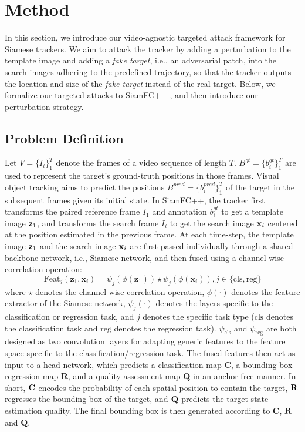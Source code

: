 \documentclass[journal]{IEEEtran}
\newcommand{\ie}{i.e.}
\renewcommand{\uline}{}
\begin{document}
\section{Method}\label{method}

In this section, we introduce our video-agnostic targeted attack framework for Siamese trackers. We aim to attack the tracker by adding a perturbation to the template image and adding a \textit{fake target}, i.e., an adversarial patch, into the search images adhering to the predefined trajectory, so that the tracker outputs the location and size of the \textit{fake target} instead of the real target. Below, we formalize our targeted attacks to SiamFC++ \cite{SiamFC++}, and then introduce our perturbation strategy.
\vspace{-5mm}
 
\subsection{Problem Definition}\label{problemdefinition}

Let $V=\{I_i\}_1^T$ denote the frames of a video sequence of length $T$. $B^{gt}=\{b^{gt}_i\}_1^T$ are used to represent the target's ground-truth positions in those frames. Visual object tracking aims to predict the positions $B^{pred}=\{b^{pred}_i\}_1^T$ of the target in the subsequent frames given its initial state. In SiamFC++, the tracker first transforms the paired reference frame $I_1$ and annotation $b_1^{gt}$ to get a template image $\textbf z_1$, and transforms the search frame $I_i$ to get the search image $\textbf x_i$ centered at the position estimated in the previous frame. At each time-step, the template image $\textbf z_1$ and the search image $\textbf x_i$ are first passed individually through a shared backbone network, \ie, Siamese network, and then fused using a channel-wise correlation operation:
\begin{equation}
  \text{Feat}_{j}(\mathbf{z}_1, \mathbf{x}_i)=\psi_{j}(\phi(\mathbf{z}_1)) \star \psi_{j}(\phi(\mathbf{x}_i)), j \in\{\mathrm{cls}, \mathrm{reg}\}
\end{equation}
where $\star$ denotes the channel-wise correlation operation, $\phi(\cdot)$ denotes the feature extractor of the Siamese network, $\psi_j(\cdot)$ denotes the layers specific to the classification or regression task, and $j$ denotes the specific task type ($\mathrm{cls}$ denotes the classification task and $\mathrm{reg}$ denotes the regression task). $\psi_{\mathrm{cls}}$ and $\psi_{\mathrm{reg}}$ are both designed as two \uline{convolution} layers for adapting generic features to the feature space specific to the classification/regression task. The fused features then act as input to a head network, which predicts a classification map $\textbf{C}$, a bounding box regression map $\textbf{R}$, and a quality assessment map $\textbf{Q}$ in an anchor-free manner. In short, $\textbf C$ encodes the probability of each spatial position to contain the target, $\textbf R$ regresses the bounding box of the target, and $\textbf Q$ predicts the target state estimation quality. The final bounding box is then generated according to $\textbf{C}$, $\textbf{R}$ and $\textbf{Q}$.
\end{document}
